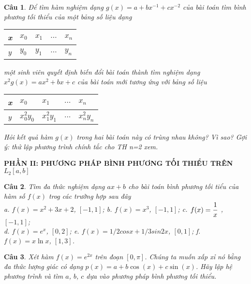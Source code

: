 \documentclass[11pt]{article}
\newtheorem{bt}{Câu}
\begin{document}
\begin{bt} Để tìm hàm nghiệm dạng $g(x)=a + bx^{-1} + cx^{-2}$ của bài toán tìm bình phương tối thiểu của một bảng số liệu dạng
	\begin{center}
		\begin{tabular}[5]{l|l|l|l|l}
			x & $x_0$ & $x_1$ & $\dots$ & $x_n$  \\ \hline
			y & $y_0$ & $y_1$ & $\dots$ & $y_n$
		\end{tabular}	
	\end{center}
	một sinh viên quyết định biến đổi bài toán thành tìm nghiệm dạng $x^2 g(x) = ax^2 + bx + c$	của bài toán mới tương ứng với bảng số liệu
	\begin{center}
		\begin{tabular}[5]{l|l|l|l|l}
			x & $x_0$ & $x_1$ & $\dots$ & $x_n$  \\[.2pt] \hline
			y & $x_{0}^2y_0$ & $x_{1}^2 y _1$ & $\dots$ & $x_{n}^2 y _n$
		\end{tabular}	
	\end{center}
	Hỏi kết quả hàm $g(x)$ trong hai bài toán này có trùng nhau không? Vì sao? Gợi ý: thử lập phương trình chính tắc cho TH n=2 xem.
\end{bt}


\newpage 


\begin{center}	
	\textbf{PHẦN II: PHƯƠNG PHÁP BÌNH PHƯƠNG TỐI THIỂU TRÊN $L_2[a,b]$}
\end{center}


\begin{bt}
	Tìm đa thức nghiệm dạng $ax+b$ cho bài toán bình phương tối tiểu của hàm số $f(x)$ trog các trường hợp sau đây \\
	a. $f(x) = x^2 + 3x + 2$, $[-1,1]$; \qquad b. $f(x) = x^3$, $[-1, 1]$; \qquad c. $f(x) = \cfrac{1}{x}$\ , $[-1, 1]$; \\
	d. $f(x) = e^x$, $[0, 2]$; \qquad e. $f(x) = 1/2 cos x + 1/3 sin 2x$, $[0, 1]$; \qquad f. $f(x) = x \ln x$, $[1, 3]$.
\end{bt}

\begin{bt}
Xét hàm $f(x) = e^{2x}$ trên đoạn $[0, \pi]$. Chúng ta muốn xấp xỉ nó bằng đa thức lượng giác có dạng $p(x) = a + b \cos(x) + c \sin(x)$. Hãy lập hệ phương trình và tìm $a$, $b$, $c$ dựa vào phương pháp bình phương tối thiểu.
\end{bt}
\end{document}
